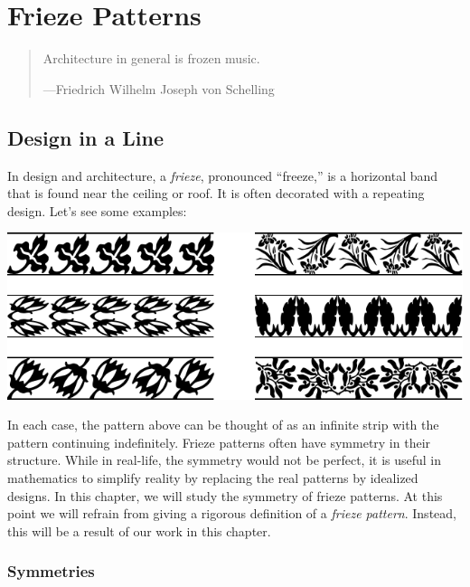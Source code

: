 \chapter{Frieze Patterns}

\begin{quote}
Architecture in general is frozen music.

\hfill---Friedrich Wilhelm Joseph von Schelling 

\end{quote}


\section{Design in a Line}

In design and architecture, a \textit{frieze},
pronounced ``freeze,'' is a horizontal band that is found near the
ceiling or roof. It is often decorated with a repeating design. Let's
see some examples:
\begin{center}
\includegraphics{../graphics/fpfrieze.pdf}
\end{center}
In each case, the pattern above can be thought of as an infinite strip
with the pattern continuing indefinitely.  Frieze patterns often have
symmetry in their structure. While in real-life, the symmetry would
not be perfect, it is useful in mathematics to simplify reality by
replacing the real patterns by idealized designs.  In this chapter, we
will study the symmetry of frieze patterns. At this point we will
refrain from giving a rigorous definition of a \textit{frieze
  pattern}. Instead, this will be a result of our work in this
chapter.


\break

\subsection{Symmetries}

